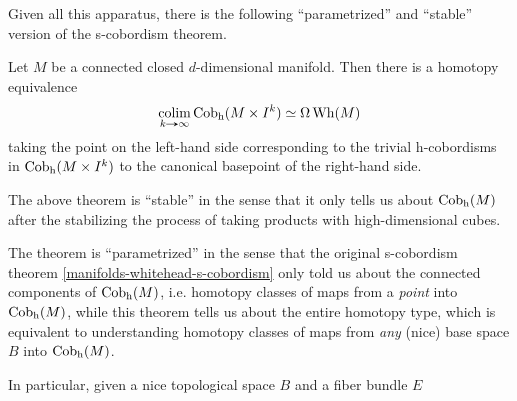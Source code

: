 \begin{nothing}
\begin{subnothing}
    Given all this apparatus, there is the following ``parametrized'' and ``stable'' version of the s-cobordism theorem.
  \end{subnothing}

  \begin{subtheorem}
    \label{manifolds-whitehead-parametrized-s-cobordism}
    Let $M$ be a connected closed $d$-dimensional manifold. Then there is a homotopy equivalence
    \[
      \colim_{k \limto \infty} \hCob(M \times I^k) \iso \Omega\Wh(M)
    \]
    taking the point on the left-hand side corresponding to the trivial h-cobordisms in $\operatorname{Cob_h}(M \times I^k)$ to the canonical basepoint of the right-hand side.
  \end{subtheorem}

  \begin{subremark}
    The above theorem is ``stable'' in the sense that it only tells us about $\operatorname{Cob_h}(M)$ after the stabilizing the process of taking products with high-dimensional cubes.

    The theorem is ``parametrized'' in the sense that the original s-cobordism theorem \cref{manifolds-whitehead-s-cobordism} only told us about the connected components of $\operatorname{Cob_h}(M)$, i.e. homotopy classes of maps from a \emph{point} into $\operatorname{Cob_h}(M)$, while this theorem tells us about the entire homotopy type, which is equivalent to understanding homotopy classes of maps from \emph{any} (nice) base space $B$ into $\operatorname{Cob_h}(M)$.

    In particular, given a nice topological space $B$ and a fiber bundle $E$
  \end{subremark}
\end{nothing}



% 
% 


